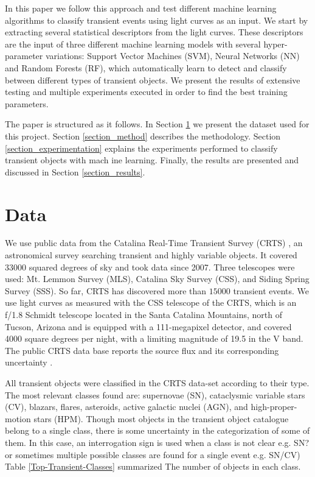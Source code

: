 \documentclass[a4paper,fleqn,usenatbib]{mnras}
\begin{document}
In this paper we follow this approach and test different machine
learning algorithms to classify transient events using light curves as
an input.  
We start by extracting several statistical descriptors from the light
curves.
These descriptors are the input of three different machine learning
models with several hyper-parameter variations: Support Vector
Machines (SVM), Neural Networks (NN) and Random Forests (RF), which automatically
learn to detect and classify between different types of transient
objects. 
We present the results of extensive testing and multiple experiments 
executed in order to find the best training parameters. 

The paper is structured as it follows. In Section \ref{section_data}
we present the dataset used for this project. 
Section \ref{section_method} describes the methodology.
Section \ref{section_experimentation} explains the experiments
performed to classify transient objects with mach ine
learning. 
Finally, the results are presented and discussed in
Section \ref{section_results}.  

\section{Data} \label{section_data}

We use public data from the Catalina Real-Time Transient Survey
(CRTS) \citep{1111.2566}, an astronomical survey searching transient
and highly variable objects.   
It covered 33000 squared degrees of sky and took data since 2007.
Three telescopes were used: Mt. Lemmon Survey (MLS), Catalina Sky
Survey (CSS), and Siding Spring Survey (SSS). So far, CRTS has
discovered more than $15000$ transient events.
We use light curves as measured with the CSS telescope of the CRTS, which is
an f/1.8 Schmidt telescope located in the Santa Catalina Mountains, north of Tucson,
Arizona and is equipped with a 111-megapixel  detector, and covered
4000 square degrees per night, with a limiting magnitude of 19.5 in
the V band.  
The public CRTS data base reports the source flux and its
corresponding uncertainty \citep{1996PASP..108..851S}.


All transient objects were classified in the CRTS data-set according to
their type. 
The most relevant classes found are: supernovae (SN),
cataclysmic variable stars (CV), blazars, flares, asteroids, active
galactic nuclei (AGN), and high-proper-motion stars (HPM). 
Though most objects in the transient object catalogue belong to a single class,
there is some uncertainty in the categorization of some of
them. 
In this case, an interrogation sign is used when a class is not clear
e.g. SN? or sometimes multiple possible classes are found for a single
event e.g. SN/CV)
Table \ref{Top-Transient-Classes} summarized The number of objects in each class.
\end{document}
